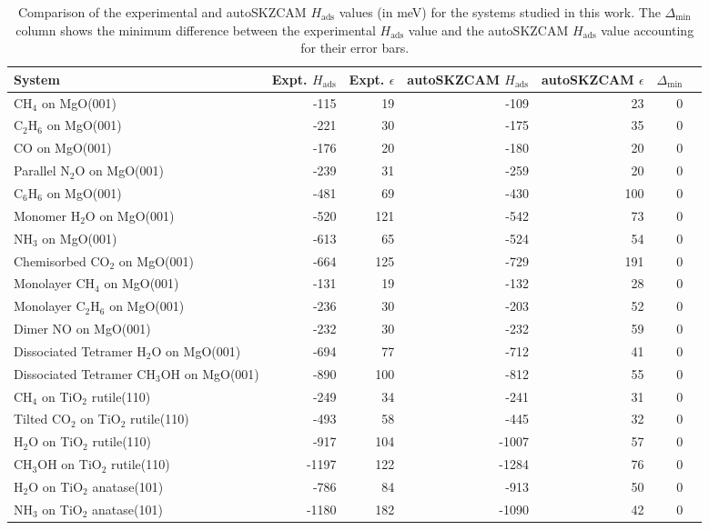 \begin{table}
\caption{\label{tab:hads_comparison}Comparison of the experimental and autoSKZCAM $H_\textrm{ads}$ values (in meV) for the systems studied in this work. The $\Delta_\textrm{min}$ column shows the minimum difference between the experimental $H_\textrm{ads}$ value and the autoSKZCAM $H_\textrm{ads}$ value accounting for their error bars.}
\begin{adjustbox}{center,max width=0.9\textwidth}
\begin{tabular}{lrrrrrr}
\toprule
System & Expt. $H_\textrm{ads}$ & Expt. $\epsilon$ & autoSKZCAM $H_\textrm{ads}$ & autoSKZCAM $\epsilon$ & $\Delta_\textrm{min}$ \\ 
\midrule
CH$_4$ on MgO(001) & -115 & 19 & -109 & 23 & 0 \\
C$_2$H$_6$ on MgO(001) & -221 & 30 & -175 & 35 & 0 \\
CO on MgO(001) & -176 & 20 & -180 & 20 & 0 \\
Parallel N$_2$O on MgO(001) & -239 & 31 & -259 & 20 & 0 \\
C$_6$H$_6$ on MgO(001) & -481 & 69 & -430 & 100 & 0 \\
Monomer H$_2$O on MgO(001) & -520 & 121 & -542 & 73 & 0 \\
NH$_3$ on MgO(001) & -613 & 65 & -524 & 54 & 0 \\
Chemisorbed CO$_2$ on MgO(001) & -664 & 125 & -729 & 191 & 0 \\
Monolayer CH$_4$ on MgO(001) & -131 & 19 & -132 & 28 & 0 \\
Monolayer C$_2$H$_6$ on MgO(001) & -236 & 30 & -203 & 52 & 0 \\
Dimer NO on MgO(001) & -232 & 30 & -232 & 59 & 0 \\
Dissociated Tetramer H$_2$O on MgO(001) & -694 & 77 & -712 & 41 & 0 \\
Dissociated Tetramer CH$_3$OH on MgO(001) & -890 & 100 & -812 & 55 & 0 \\
CH$_4$ on TiO$_2$ rutile(110) & -249 & 34 & -241 & 31 & 0 \\
Tilted CO$_2$ on TiO$_2$ rutile(110) & -493 & 58 & -445 & 32 & 0 \\
H$_2$O on TiO$_2$ rutile(110) & -917 & 104 & -1007 & 57 & 0 \\
CH$_3$OH on TiO$_2$ rutile(110) & -1197 & 122 & -1284 & 76 & 0 \\
H$_2$O on TiO$_2$ anatase(101) & -786 & 84 & -913 & 50 & 0 \\
NH$_3$ on TiO$_2$ anatase(101) & -1180 & 182 & -1090 & 42 & 0 \\
\bottomrule
\end{tabular}
\end{adjustbox}
\end{table}